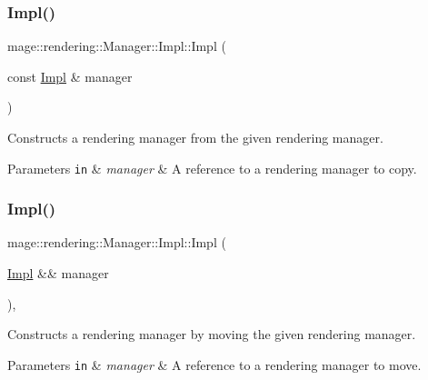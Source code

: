 \subsubsection{\texorpdfstring{Impl()}{Impl()}\hspace{0.1cm}{\footnotesize\ttfamily [2/3]}}
{\footnotesize\ttfamily mage\+::rendering\+::\+Manager\+::\+Impl\+::\+Impl (\begin{DoxyParamCaption}\item[{const \mbox{\hyperlink{classmage_1_1rendering_1_1_manager_1_1_impl}{Impl}} \&}]{manager }\end{DoxyParamCaption})\hspace{0.3cm}{\ttfamily [delete]}}

Constructs a rendering manager from the given rendering manager.


\begin{DoxyParams}[1]{Parameters}
\mbox{\tt in}  & {\em manager} & A reference to a rendering manager to copy. \\
\hline
\end{DoxyParams}
\mbox{\label{classmage_1_1rendering_1_1_manager_1_1_impl_af9164e13dda6ab8b553e58c62ca79378}} 
\subsubsection{\texorpdfstring{Impl()}{Impl()}\hspace{0.1cm}{\footnotesize\ttfamily [3/3]}}
{\footnotesize\ttfamily mage\+::rendering\+::\+Manager\+::\+Impl\+::\+Impl (\begin{DoxyParamCaption}\item[{\mbox{\hyperlink{classmage_1_1rendering_1_1_manager_1_1_impl}{Impl}} \&\&}]{manager }\end{DoxyParamCaption})\hspace{0.3cm}{\ttfamily [default]}, {\ttfamily [noexcept]}}

Constructs a rendering manager by moving the given rendering manager.


\begin{DoxyParams}[1]{Parameters}
\mbox{\tt in}  & {\em manager} & A reference to a rendering manager to move. \\
\hline
\end{DoxyParams}
\mbox{\label{classmage_1_1rendering_1_1_manager_1_1_impl_a34e0d4635b02ea40cc01847d0e1a4fb7}} 
